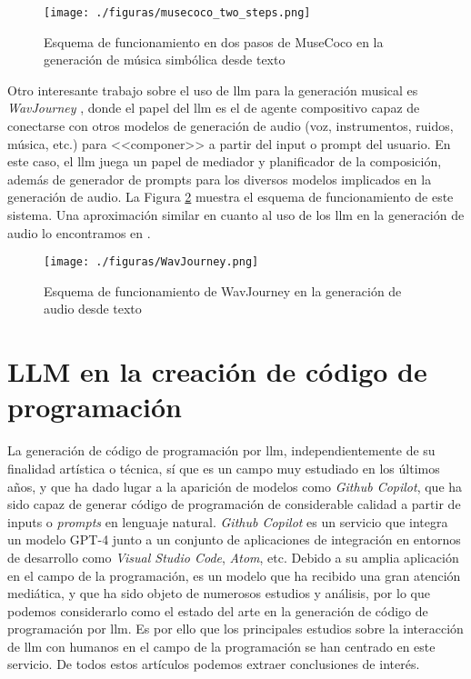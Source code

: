 \begin{figure}[H]
    \caption[Esquema de funcionamiento en dos pasos de MuseCoco texto--música]{Esquema de funcionamiento en dos pasos de MuseCoco en la generación de música simbólica desde texto}
    \centering
    \texttt{[image: ./figuras/musecoco\_two\_steps.png]}
    \label{fig:musecoco}
\end{figure}

Otro interesante trabajo sobre el uso de \gls{llm} para la generación musical es \textit{WavJourney} \citep{liuWavJourneyCompositionalAudio2023}, donde el papel del \gls{llm} es el de agente compositivo capaz de conectarse con otros modelos de generación de audio (voz, instrumentos, ruidos, música, etc.) para <<componer>> a partir del input o prompt del usuario. En este caso, el \gls{llm} juega un papel de mediador y planificador de la composición, además de generador de prompts para los diversos modelos implicados en la generación de audio. La Figura \ref{fig:wavjourney} muestra el esquema de funcionamiento de este sistema. Una aproximación similar en cuanto al uso de los \gls{llm} en la generación de audio lo encontramos en \cite{borsosAudioLMLanguageModeling2023}.

\begin{figure}[H]
    \caption[Esquema de funcionamiento de WavJourney]{Esquema de funcionamiento de WavJourney en la generación de audio desde texto}
    \centering
    \texttt{[image: ./figuras/WavJourney.png]}
    \label{fig:wavjourney}
\end{figure}

\section{LLM en la creación de código de programación}
\label{sec:llm_creacion_codigo_programacion_estado_cuestion}

La generación de código de programación por \gls{llm}, independientemente de su finalidad artística o técnica, sí que es un campo muy estudiado en los últimos años, y que ha dado lugar a la aparición de modelos como \textit{Github Copilot}, que ha sido capaz de generar código de programación de considerable calidad a partir de inputs o \textit{prompts} en lenguaje natural. \textit{Github Copilot} es un servicio que integra un modelo GPT-4 junto a un conjunto de aplicaciones de integración en entornos de desarrollo como \textit{Visual Studio Code}, \textit{Atom}, etc. Debido a su amplia aplicación en el campo de la programación, es un modelo que ha recibido una gran atención mediática, y que ha sido objeto de numerosos estudios y análisis, por lo que podemos considerarlo como el estado del arte en la generación de código de programación por \gls{llm}. Es por ello que los principales estudios sobre la interacción de \gls{llm} con humanos en el campo de la programación se han centrado en este servicio. De todos estos artículos podemos extraer conclusiones de interés.

